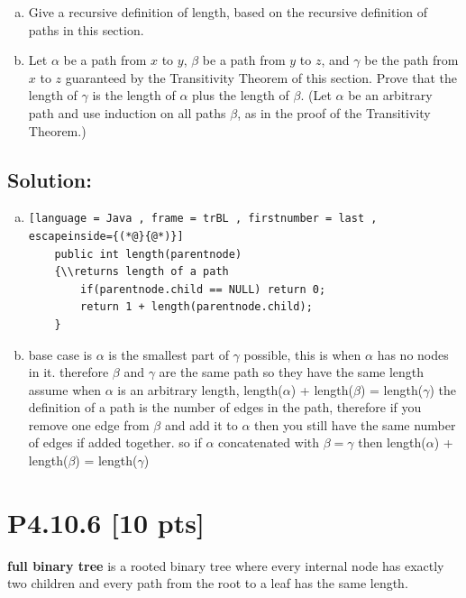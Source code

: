 \documentclass[12pt]{article}
\begin{document}
\begin{enumerate}[(a)]
    \item  Give a recursive definition of length, based on the recursive definition of paths in this section.


    \item  Let $\alpha$ be a path from $x$ to $y$, $\beta$ be a path from $y$ to $z$, and $\gamma$ be the path from $x$ to $z$ guaranteed by the Transitivity Theorem of this section. Prove that the length of $\gamma$ is the length of $\alpha$ plus the length of  $\beta$. (Let $\alpha$ be an arbitrary path and use induction on all paths  $\beta$, as in the proof of the Transitivity Theorem.)

\end{enumerate}
\subsection*{\textbf{Solution:}}

\begin{enumerate}[(a)]
    \item 
    \begin{lstlisting}[language = Java , frame = trBL , firstnumber = last , escapeinside={(*@}{@*)}]
    public int length(parentnode)
    {\\returns length of a path
        if(parentnode.child == NULL) return 0;
        return 1 + length(parentnode.child);
    }
    \end{lstlisting}
    \item base case is $\alpha$ is the smallest part of $\gamma$ possible, this is when $\alpha$ has no nodes in it. therefore $\beta$ and $\gamma$ are the same path so they have the same length \newline
    assume when $\alpha$ is an arbitrary length, length($\alpha$) + length($\beta$) = length($\gamma$)\newline
    the definition of a path is the number of edges in the path, therefore if you remove one edge from $\beta$ and add it to $\alpha$ then you still have the same number of edges if added together. so if $\alpha$ concatenated with $\beta=\gamma$ then length($\alpha$) + length($\beta$) = length($\gamma$)
    
\end{enumerate}


\newpage
\section*{\textbf{P4.10.6} [10 pts]}
\textbf{full binary tree} is a rooted binary tree where every internal node has exactly two children and every path from the root to a leaf has the same length.
\end{document}
